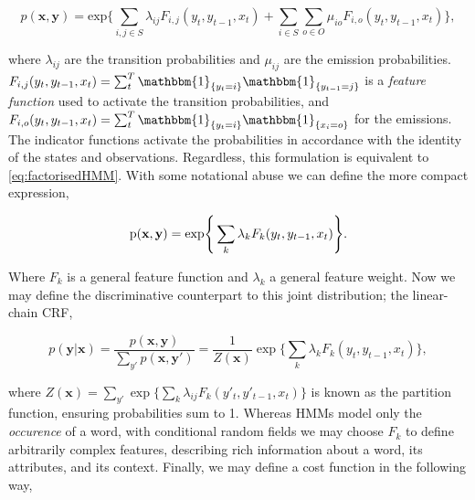 
\begin{equation}
p(\textbf{x}, \textbf{y}) = \text{exp} \Bigg\{
\sum_{i, j \in S}{
\lambda_{ij}F_{i,j}(y_t, y_{t-1}, x_t)
}
+
\sum_{i \in S}\sum_{o \in O}{
\mu_{io}F_{i,o}(y_t, y_{t-1}, x_t)
}
\Bigg\},
\label{eq:jointcrf}
\end{equation}

where $\lambda_{ij}$ are the transition probabilities and $\mu_{ij}$ are the emission probabilities. $F_{i,j}(y_t, y_{t-1}, x_t) = \sum_t^T\mathbbm{1}_{\{y_t = i\}}\mathbbm{1}_{\{y_{t-1} = j\}}$ is a \emph{feature function} used to activate the transition probabilities, and $F_{i,o}(y_t, y_{t-1}, x_t) = \sum_t^T\mathbbm{1}_{\{y_t = i\}}\mathbbm{1}_{\{x_{i} = o\}}$ for the emissions. The indicator functions activate the probabilities in accordance with the identity of the states and observations. Regardless, this formulation is equivalent to \ref{eq:factorisedHMM}. With some notational abuse we can define the more compact expression,

\begin{equation}
\text{p}(\textbf{x}, \textbf{y}) = \text{exp} \Bigg\{\sum_k{
\lambda_{k}F_{k}(y_t, y_{t-1}, x_t)
}\Bigg\}.
\label{eq:jointcrfcompact}
\end{equation}

Where $F_k$ is a general feature function and $\lambda_k$ a general feature weight. Now we may define the discriminative counterpart to this joint distribution; the linear-chain CRF,

\begin{equation}
p(\textbf{y}|\textbf{x}) = \frac{p(\textbf{x}, \textbf{y})}{\sum_{y'}{p(\textbf{x}, \textbf{y}')}} = \frac{1}{Z(\mathbf{x})}\exp \Bigg\{\sum_k{
\lambda_{k}F_{k}(y_t, y_{t-1}, x_t)
}\Bigg\},
\end{equation}

where $Z(\mathbf{x}) = \sum_{y'}\exp \Big\{\sum_k{\lambda_{ij}F_{k}(y'_t, y'_{t-1}, x_t)}\Big\}$ is known as the partition function, ensuring probabilities sum to 1. Whereas HMMs model only the \emph{occurence} of a word, with conditional random fields we may choose $F_k$ to define arbitrarily complex features, describing rich information about a word, its attributes, and its context. Finally, we may define a cost function in the following way,

